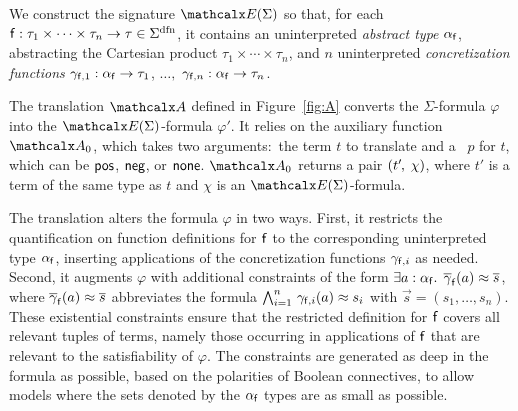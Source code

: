 We construct the signature $\extendsig{\Sigma}$ so that,
for each $\con{f} : \tau_1 \times \cdots \times \tau_n \rightarrow \tau \in \sfundefs{\Sigma}$,
it contains
an uninterpreted \emph{abstract type} $\alpha_{\mathsf{f}}$,
abstracting the Cartesian product $\tau_1 \times \cdots \times \tau_n$,
and
$n$ uninterpreted \emph{concretization functions} $\gamma_{\mathsf{f},1} : \alpha_{\mathsf{f}} \rightarrow \tau_1$, $\dotsc,$ $\gamma_{\mathsf{f},n} : \alpha_{\mathsf{f}} \rightarrow \tau_n$.

The translation $\conv$ defined in Figure~\ref{fig:A} converts the $\Sigma$-formula
$\varphi$ into the $\extendsig{\Sigma}$-formula $\varphi'$. It relies
on the auxiliary function $\conv_0$, which takes two arguments:\ the term $t$
to translate and a ~$p$ for $t$, which can be $\mathsf{pos}$, $\mathsf{neg}$, or
$\mathsf{none}$.
\vthinspace$\conv_0$ returns a pair $( t'\negvthinspace,\, \chi )$, where $t'$ is a term of
the same type as $t$ and $\chi$ is an $\extendsig{\Sigma}$-formula.



The translation alters the formula $\varphi$ in two ways. First, it restricts the
quantification on function definitions for $\mathsf{f}$ to the corresponding
uninterpreted type $\alpha_{\mathsf{f}}$, inserting applications of the concretization functions $\gamma_{\mathsf{f},i}$ as needed.
Second, it augments $\varphi$ with additional constraints of the form
$\exists a :\nobreak \alpha_{\mathsf{f}}.\;\, \overline{\gamma}_{\mathsf{f}}( a ) \approx \overline{s}$,
where $\overline{\gamma}_{\mathsf{f}}( a ) \approx \overline{s}$ abbreviates the formula
$\bigwedge_{i=1}^n\, \gamma_{\mathsf{f},i}(a) \approx s_i$
with $\vec s = (s_1,\dotsc,s_n)$.
These existential %
constraints
ensure that the restricted definition for $\mathsf{f}$ covers all relevant tuples
of terms, namely those occurring in applications of $\mathsf{f}$
that are relevant to the satisfiability of $\varphi$. The constraints are
generated as deep in the formula as possible, based on the
polarities of Boolean connectives, to allow models where the sets
denoted by the $\alpha_{\mathsf{f}}$ types are as small as possible.

